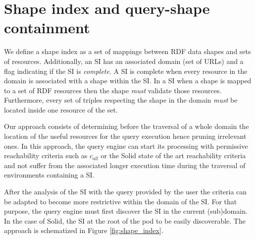 \section{Shape index and query-shape containment}


We define a shape index as a set of mappings between RDF data shapes and sets of resources.
Additionally, an SI has an associated domain (set of URLs)
and a flag indicating if the SI is \emph{complete}.
A SI is complete when every resource in the domain is associated with a shape within the SI.
In a SI when a shape is mapped to a set of RDF resources then the shape \emph{must} validate those resources.
Furthermore, every set of triples respecting the shape in the domain \emph{must} be located inside one resource of the set.

Our approach consists of determining before the traversal of a whole domain the location of the useful resources for the query execution hence pruning irrelevant ones. 
In this approach, the query engine can start its processing with permissive reachability criteria
such as $c_{all}$ \cite{Hartig2012} or the Solid state of the art reachability criteria \cite{Taelman2023}
and not suffer from the associated longer execution time during the traversal of environments containing a SI.

After the analysis of the SI with the query provided by the user the criteria can be adapted to become more restrictive within the domain of the SI.
For that purpose, the query engine must first discover the SI in the current (sub)domain.
In the case of Solid, the SI  at the root of the pod to be easily discoverable.
The approach is schematized in Figure \ref{fig:shape_index}.

